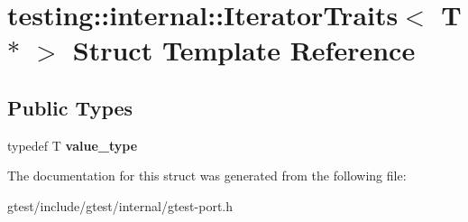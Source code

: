\hypertarget{structtesting_1_1internal_1_1IteratorTraits_3_01T_01_5_01_4}{}\section{testing\+:\+:internal\+:\+:Iterator\+Traits$<$ T $\ast$ $>$ Struct Template Reference}
\label{structtesting_1_1internal_1_1IteratorTraits_3_01T_01_5_01_4}
\subsection*{Public Types}
\begin{DoxyCompactItemize}
\item 
\mbox{\label{structtesting_1_1internal_1_1IteratorTraits_3_01T_01_5_01_4_a7e46869ed36cc5aea898e243d270a8be}} 
typedef T {\bfseries value\+\_\+type}
\end{DoxyCompactItemize}


The documentation for this struct was generated from the following file\+:\begin{DoxyCompactItemize}
\item 
gtest/include/gtest/internal/gtest-\/port.\+h\end{DoxyCompactItemize}
